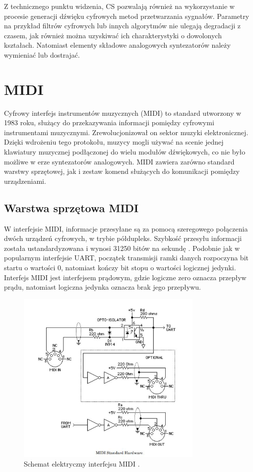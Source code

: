 
Z technicznego punktu widzenia, CS pozwalają również na wykorzystanie w procesie generacji dźwięku cyfrowych metod przetwarzania sygnałów. Parametry na przykład filtrów cyfrowych lub innych algorytmów nie ulegają degradacji z czasem, jak również można uzyskiwać ich charakterystyki o dowolonych kształach. Natomiast elementy składowe analogowych syntezatorów należy wymieniać lub dostrajać.


\section{MIDI}
Cyfrowy interfejs instrumentów muzycznych (MIDI) to standard utworzony w 1983 roku, służący do przekazywania informacji pomiędzy cyfrowymi instrumentami muzycznymi. Zrewolucjonizował on sektor muzyki elektronicznej. Dzięki wdrożeniu tego protokołu, muzycy mogli używać na scenie jednej klawiatury muzycznej podłączonej do wielu modułów dźwiękowych, co nie było możliwe w erze syntezatorów analogowych. MIDI zawiera zarówno standard warstwy sprzętowej, jak i zestaw komend służących do komunikacji pomiędzy urządzeniami.

\subsection{Warstwa sprzętowa MIDI}
W interfejsie MIDI, informacje przesyłane są za pomocą szeregowego połączenia dwóch urządzeń cyfrowych, w trybie półdupleks. Szybkość przesyłu informacji została ustandardyzowana i wynosi 31250 bitów na sekundę \cite{dokumentacja_midi}. 
Podobnie jak w popularnym interfejsie UART, początek transmisji ramki danych rozpoczyna bit startu o wartości 0, natomiast kończy bit stopu o wartości logicznej jedynki. Interfejs MIDI jest interfejsem prądowym, gdzie logiczne zero oznacza przepływ prądu, natomiast logiczna jedynka oznacza brak jego przepływu.

\begin{figure}[H]
	\centering
	\includegraphics[width=9cm]{./grafiki/hardware_midi}
	\captionsetup{justification=centering}
	\caption{Schemat elektryczny interfejsu MIDI \cite{dokumentacja_midi}.}
	\label{rys:hardware_midi}
\end{figure}

